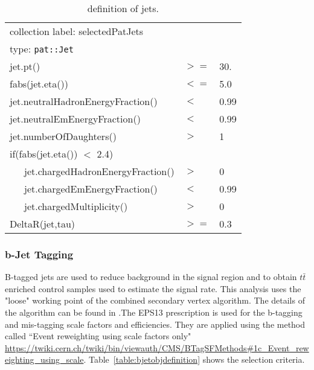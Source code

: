 \begin{table}[htb]
  \caption{definition of jets.}
   \label{table:jetobjdefinition}
  \begin{center}
    \ttfamily\scriptsize\selectfont
    \begin{tabular}{|l|ll|}
      \hline
      \multicolumn{3}{|l|}{ collection label: selectedPatJets}\\
      \multicolumn{3}{|l|}{ type: \texttt{pat::Jet}}\\
      \hline
      jet.pt() & $>=$ & 30. \\
      fabs(jet.eta()) & $<=$ & 5.0 \\
      jet.neutralHadronEnergyFraction() & $<$ &  0.99 \\
      jet.neutralEmEnergyFraction() & $<$ & 0.99 \\
      jet.numberOfDaughters() & $>$& 1 \\
      if(fabs(jet.eta()) $<$ 2.4) && \\
      ~~~jet.chargedHadronEnergyFraction() & $>$ & 0 \\
      ~~~jet.chargedEmEnergyFraction() & $<$ & 0.99 \\
      ~~~jet.chargedMultiplicity() & $>$ & 0 \\
      DeltaR(jet,tau) & $>=$ & 0.3 \\
      \hline
    \end{tabular}
  \end{center}
\end{table}

\subsubsection{b-Jet Tagging}
B-tagged jets are used to reduce \ttbar background in the signal region and to obtain $t\bar{t}$ enriched control samples used to estimate the signal rate. 
This analysis uses the "loose" working point of the combined secondary vertex algorithm.
The details of the algorithm can be found in \cite{CMS_PAS_BTV_11-001}.The EPS13 prescription is used for the b-tagging and mis-tagging scale factors and efficiencies. They are applied using the method called ``Event reweighting using scale factors only" \url{https://twiki.cern.ch/twiki/bin/viewauth/CMS/BTagSFMethods\#1c\_Event\_reweighting\_using\_scale}. Table~\ref{table:bjetobjdefinition} shows the selection criteria.

